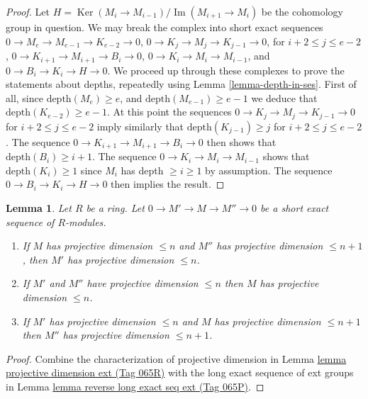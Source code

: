 \documentclass{amsart}
\theoremstyle{plain}
\newtheorem{lemma}[subsection]{Lemma}
\theoremstyle{definition}
\theoremstyle{remark}
\numberwithin{equation}{subsection}
\def\Ker{\mathop{\mathrm{Ker}}}
\def\Im{\mathop{\mathrm{Im}}}
\begin{document}
\begin{proof}
Let $H = \Ker(M_i \to M_{i-1})/\Im(M_{i + 1} \to M_i)$ be the
cohomology group in question.
We may break the complex into short exact sequences
$0 \to M_e \to M_{e-1} \to K_{e-2} \to 0$,
$0 \to K_j \to M_j \to K_{j-1} \to 0$, for $i + 2 \leq j \leq e-2 $,
$0 \to K_{i + 1} \to M_{i + 1} \to B_i \to 0$,
$0 \to K_i \to M_i \to M_{i-1}$, and
$0 \to B_i \to K_i \to H \to 0$.
We proceed up through these complexes to
prove the statements about depths, repeatedly using
Lemma \ref{lemma-depth-in-ses}.
First of all, since $\text{depth}(M_e) \geq e$,
and $\text{depth}(M_{e-1}) \geq e-1$ we deduce
that $\text{depth}(K_{e-2}) \geq e - 1$. At this point the
sequences $0 \to K_j \to M_j \to K_{j-1} \to 0$ for $i + 2 \leq j \leq e-2 $
imply similarly that $\text{depth}(K_{j-1}) \geq j$ for
$i + 2 \leq j \leq e-2$. The sequence
$0 \to K_{i + 1} \to M_{i + 1} \to B_i \to 0$
then shows that $\text{depth}(B_i) \geq i + 1$. The sequence
$0 \to K_i \to M_i \to M_{i-1}$ shows that $\text{depth}(K_i) \geq 1$
since $M_i$ has depth $\geq i \geq 1$ by assumption.
The sequence $0 \to B_i \to K_i \to H \to 0$ then
implies the result.
\end{proof}


\begin{lemma}
\label{lemma-exact-sequence-projective-dimension}
Let $R$ be a ring. Let $0 \to M' \to M \to M'' \to 0$ be a short
exact sequence of $R$-modules.
\begin{enumerate}
\item If $M$ has projective dimension $\leq n$ and $M''$
has projective dimension $\leq n + 1$, then $M'$ has projective
dimension $\leq n$.
\item If $M'$ and $M''$ have projective dimension
$\leq n$ then $M$ has projective dimension $\leq n$.
\item If $M'$ has projective dimension $\leq n$ and
$M$ has projective dimension $\leq n + 1$ then
$M''$ has projective dimension $\leq n + 1$.
\end{enumerate}
\end{lemma}

\begin{proof}
Combine the characterization of projective dimension in
Lemma \href{https://stacks.math.columbia.edu/tag/065R}{lemma projective dimension ext (Tag 065R)}
with the long exact sequence of ext groups in
Lemma \href{https://stacks.math.columbia.edu/tag/065P}{lemma reverse long exact seq ext (Tag 065P)}.
\end{proof}
\end{document}
